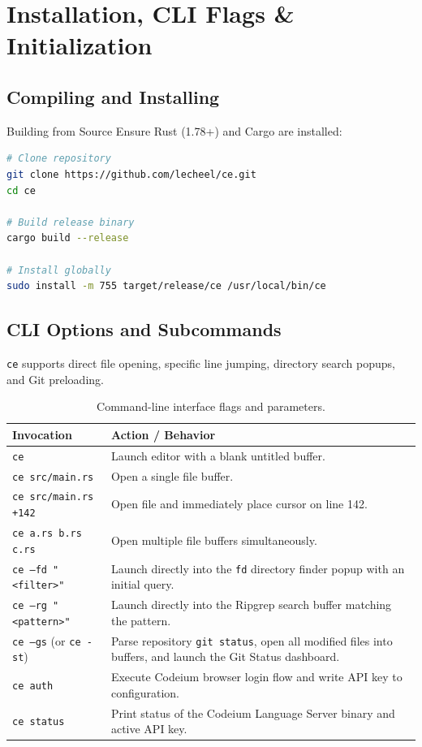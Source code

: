 \documentclass[11pt,a4paper,openany]{book}
\newcommand{\code}[1]{\colorbox{inlinebg}{\texttt{#1}}}
\begin{document}
\chapter{Installation, CLI Flags \& Initialization}

\section{Compiling and Installing}
\begin{recipebox}{Building from Source}
Ensure Rust (1.78+) and Cargo are installed:
\begin{lstlisting}[language=bash]
# Clone repository
git clone https://github.com/lecheel/ce.git
cd ce

# Build release binary
cargo build --release

# Install globally
sudo install -m 755 target/release/ce /usr/local/bin/ce
\end{lstlisting}
\end{recipebox}

\section{CLI Options and Subcommands}
\texttt{ce} supports direct file opening, specific line jumping, directory search popups, and Git preloading.

\begin{table}[htbp]
\centering
\small
\begin{tabularx}{\textwidth}{l X}
\toprule
\textbf{Invocation} & \textbf{Action / Behavior} \\
\midrule
\code{ce} & Launch editor with a blank untitled buffer. \\
\code{ce src/main.rs} & Open a single file buffer. \\
\code{ce src/main.rs +142} & Open file and immediately place cursor on line 142. \\
\code{ce a.rs b.rs c.rs} & Open multiple file buffers simultaneously. \\
\code{ce --fd "<filter>"} & Launch directly into the \texttt{fd} directory finder popup with an initial query. \\
\code{ce --rg "<pattern>"} & Launch directly into the Ripgrep search buffer matching the pattern. \\
\code{ce --gs} (or \code{ce -st}) & Parse repository \texttt{git status}, open all modified files into buffers, and launch the Git Status dashboard. \\
\code{ce auth} & Execute Codeium browser login flow and write API key to configuration. \\
\code{ce status} & Print status of the Codeium Language Server binary and active API key. \\
\bottomrule
\end{tabularx}
\caption{Command-line interface flags and parameters.}
\end{table}
\end{document}
